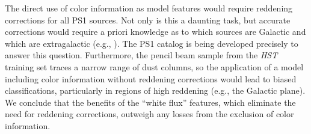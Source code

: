 \documentclass[twocolumn]{aastex62}
\begin{document}
The direct use of color information as model features would require reddening
corrections for all PS1 sources. Not only is this a daunting task, but
accurate corrections would require a priori knowledge as to which sources are
Galactic and which are extragalactic (e.g., \citealt{Green15}). The PS1
catalog is being developed precisely to answer this question. Furthermore,
the pencil beam sample from the \textit{HST} training set traces a narrow
range of dust columns, so the application of a model including color
information without reddening corrections would lead to biased
classifications, particularly in regions of high reddening (e.g., the
Galactic plane). We conclude that the benefits of the ``white flux''
features, which eliminate the need for reddening corrections, outweigh any
losses from the exclusion of color information.
\end{document}

